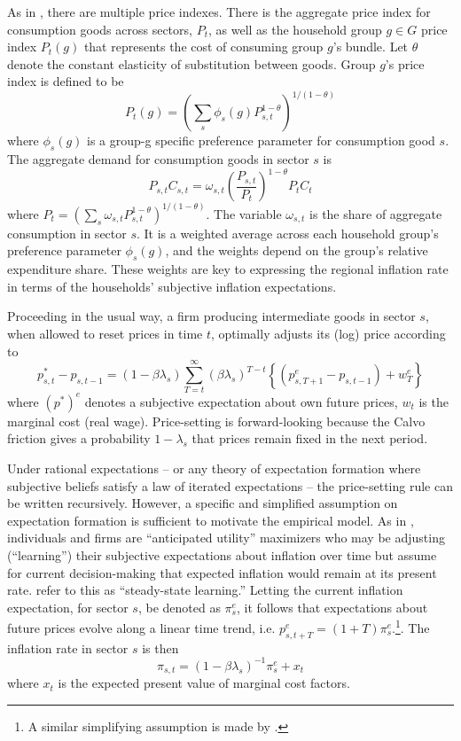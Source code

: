 \documentclass[12pt]{article}
\begin{document}
As in \cite{Cravinoetal:JME2020}, there are multiple price indexes. There is the aggregate price index for consumption goods across sectors, $P_t$, as well as the household group $g\in G$ price index $P_t(g)$ that represents the cost of consuming group $g$'s bundle. Let $\theta$ denote the constant elasticity of substitution between goods. Group $g$'s price index is defined to be
$$ P_t(g) = \left( \sum_s \phi_s(g)P^{1-\theta}_{s,t}\right)^{1/(1-\theta)}$$
where $\phi_s(g)$ is a group-g specific preference parameter for consumption good $s$. The aggregate demand for consumption goods in sector $s$ is
$$ P_{s,t}C_{s,t} = \omega_{s,t}\left(\frac{P_{s,t}}{P_t}\right)^{1-\theta} P_tC_t$$
where $P_t=\left(\sum_s\omega_{s,t}P_{s,t}^{1-\theta}\right)^{1/(1-\theta)}$. The variable $\omega_{s,t}$ is the share of aggregate consumption in sector $s$. It is a weighted average across each household group's preference parameter $\phi_s(g)$, and the weights depend on the group's relative expenditure share. These weights are key to expressing the regional inflation rate in terms of the households' subjective inflation expectations.

Proceeding in the usual way, a firm producing intermediate goods in sector $s$, when allowed to reset prices in time $t$, optimally adjusts its (log) price according to
$$p^*_{s,t} - p_{s,t-1}= \left( 1-\beta\lambda_s\right)\sum_{T=t}^{\infty}\left(\beta\lambda_s\right)^{T-t}\left\{ \left(p^e_{s,T+1}-p_{s,t-1}\right) + w^e_{T}\right\}$$
where $(p^*)^e$ denotes a subjective expectation about own future prices, $w_t$ is the marginal cost (real wage). Price-setting is forward-looking because the Calvo friction gives a probability $1-\lambda_s$ that prices remain fixed in the next period.  

Under rational expectations -- or any theory of expectation formation where subjective beliefs satisfy a law of iterated expectations -- the price-setting rule can be written recursively. However, a specific and simplified assumption on expectation formation is sufficient to motivate the empirical model. As in \cite{Woodford:annualreview}, individuals and firms are ``anticipated utility'' maximizers who may be adjusting (``learning'') their subjective expectations about inflation over time but assume for current decision-making that expected inflation would remain at its present rate. \cite{EvansHonkap-book} refer to this as ``steady-state learning.'' Letting the current inflation expectation, for sector $s$, be denoted as $\pi^e_s$, it follows that expectations about future prices evolve along a linear time trend, i.e. $p^e_{s,t+T} = (1+T)\pi^e_s$.\footnote{A similar simplifying assumption is made by \cite{Werning:expectsWP}.}. The inflation rate in sector $s$ is then
\begin{equation}\label{secPC}
 \pi_{s,t} = \left(1-\beta\lambda_s\right)^{-1} \pi^e_{s} + x_t
 \end{equation}
where $x_t$ is the expected present value of marginal cost factors.
\end{document}
